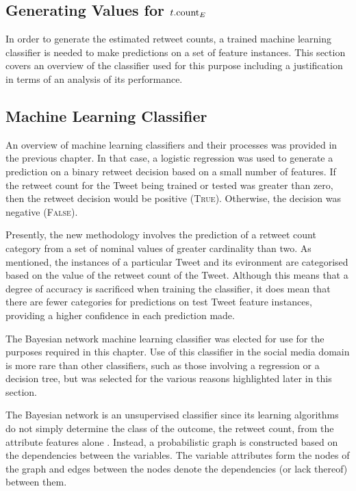 \begin{enumerate}
\section{Generating Values for $t.\textrm{count}_E$}
In order to generate the estimated retweet counts, a trained machine learning classifier is needed to make predictions on a set of feature instances. This section covers an overview of the classifier used for this purpose including a justification in terms of an analysis of its performance.


\subsection{Machine Learning Classifier}
An overview of machine learning classifiers and their processes was provided in the previous chapter. In that case, a logistic regression was used to generate a prediction on a binary retweet decision based on a small number of features. If the retweet count for the Tweet being trained or tested was greater than zero, then the retweet decision would be positive (\textsc{True}). Otherwise, the decision was negative (\textsc{False}).

Presently, the new methodology involves the prediction of a retweet count category from a set of nominal values of greater cardinality than two. As mentioned, the instances of a particular Tweet and its evironment are categorised based on the value of the retweet count of the Tweet. Although this means that a degree of accuracy is sacrificed when training the classifier, it does mean that there are fewer categories for predictions on test Tweet feature instances, providing a higher confidence in each prediction made.

The Bayesian network machine learning classifier was elected for use for the purposes required in this chapter. Use of this classifier in the social media domain is more rare than other classifiers, such as those involving a regression or a decision tree, but was selected for the various reasons highlighted later in this section.

The Bayesian network is an unsupervised classifier since its learning algorithms do not simply determine the class of the outcome, the retweet count, from the attribute features alone \cite{friedman97}. Instead, a probabilistic graph is constructed based on the dependencies between the variables. The variable attributes form the nodes of the graph and edges between the nodes denote the dependencies (or lack thereof) between them.


\end{enumerate}
